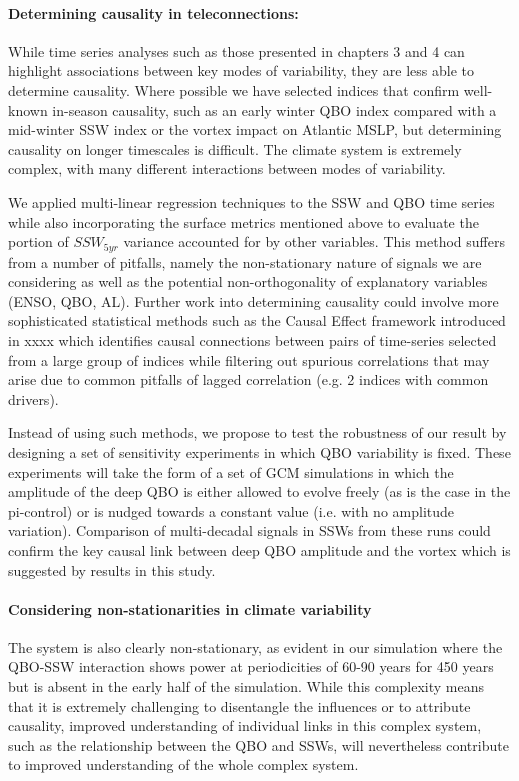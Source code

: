 \paragraph{Determining causality in teleconnections:}
While time series analyses such as those presented in chapters 3 and 4 can highlight associations between key modes of variability, they are less able to determine causality. Where possible we have selected indices that confirm well-known in-season causality, such as an early winter QBO index compared with a mid-winter SSW index or the vortex impact on Atlantic MSLP, but determining causality on longer timescales is difficult. The climate system is extremely complex, with many different interactions between modes of variability. 

We applied multi-linear regression techniques to the SSW and QBO time series while also incorporating the surface metrics mentioned above to evaluate the portion of $SSW_{5yr}$ variance accounted for by other variables. This method suffers from a number of pitfalls, namely the non-stationary nature of signals we are considering as well as the potential non-orthogonality of explanatory variables (ENSO, QBO, AL). Further work into determining causality could involve more sophisticated statistical methods such as the Causal Effect framework introduced in xxxx which identifies causal connections between pairs of time-series selected from a large group of indices while filtering out spurious correlations that may arise due to common pitfalls of lagged correlation (e.g. 2 indices with common drivers).

Instead of using such methods, we propose to test the robustness of our result by designing a set of sensitivity experiments in which QBO variability is fixed. These experiments will take the form of a set of GCM simulations in which the amplitude of the deep QBO is either allowed to evolve freely (as is the case in the pi-control) or is nudged towards a constant value (i.e. with no amplitude variation). Comparison of multi-decadal signals in SSWs from these runs could confirm the key causal link between deep QBO amplitude and the vortex which is suggested by results in this study.






\paragraph{Considering non-stationarities in climate variability}
The system is also clearly non-stationary, as evident in our simulation where the QBO-SSW interaction shows power at periodicities of 60-90 years for 450 years but is absent in the early half of the simulation. While this complexity means that it is extremely challenging to disentangle the influences or to attribute causality, improved understanding of individual links in this complex system, such as the relationship between the QBO and SSWs, will nevertheless contribute to improved understanding of the whole complex system.  

